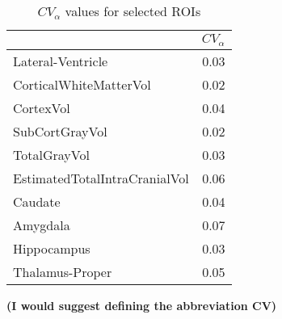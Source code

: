 \begin{table}
[]
\centering

\begin{tabular}{lr}
\toprule
{} &   $CV_{\alpha}$ \\
\midrule
Lateral-Ventricle             &  0.03 \\
CorticalWhiteMatterVol        &  0.02 \\
CortexVol                     &  0.04 \\
SubCortGrayVol                &  0.02 \\
TotalGrayVol                  &  0.03 \\
EstimatedTotalIntraCranialVol &  0.06 \\
Caudate                       &  0.04 \\
Amygdala                      &  0.07 \\
Hippocampus                   &  0.03 \\
Thalamus-Proper               &  0.05 \\
\bottomrule
\end{tabular}
\caption{$CV_{\alpha}$ values for selected ROIs}
\label{tab:cva} \textbf{(I would suggest defining the abbreviation CV)}\textit{}

\end{table}